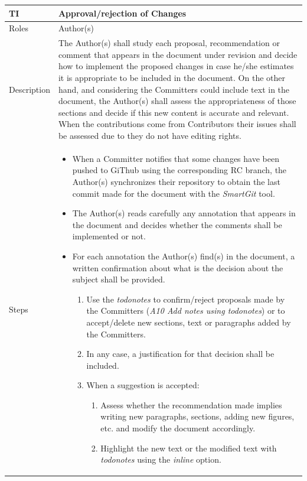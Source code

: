 \documentclass{template/openetcs_article}
\begin{document}
\begin{flushleft}
\tablefirsthead{}
\tablehead{}
\tabletail{}
\tablelasttail{}
\begin{supertabular}{|m{2cm}|m{13cm}|}
\hline
{}
TI & 
Approval/rejection of Changes
\\\hline
Roles &
Author(s)
\\\hline
Description &
The Author(s) shall study each proposal, recommendation or comment that appears in the document under revision and decide how to implement the proposed changes in case he/she estimates it is appropriate to be included in the document. On the other hand, and considering the Committers could include text in the document, the Author(s) shall assess the appropriateness of those sections and decide if this new content is accurate and relevant. When the contributions come from Contributors their issues shall be assessed due to they do not have editing rights.
\\\hline
Steps &
\begin{itemize}
\item When a Committer notifies that some changes have been pushed to GiThub using the corresponding RC branch, the Author(s) synchronizes their repository to obtain the last commit made for the document with the {\it SmartGit} tool.
\item The Author(s) reads carefully any annotation that appears in the document and decides whether the comments shall be implemented or not.
\item For each annotation the Author(s) find(s) in the document, a written confirmation about what is the decision about the subject shall be provided. 
\begin{enumerate}
\item Use the {\it todonotes} to confirm/reject proposals made by the Committers ({\it A10 Add notes using todonotes}) or to accept/delete new sections, text or paragraphs added by the Committers.
\item In any case, a justification for that decision shall be included.
\item When a suggestion is accepted:
\begin{enumerate}
\item Assess whether the recommendation made implies writing new paragraphs, sections, adding new figures, etc. and modify the document accordingly. 
\item Highlight the new text or the modified text with {\it todonotes} using the {\it inline} option.
\end{enumerate}

\end{enumerate}
\end{itemize}
\end{supertabular}
\end{flushleft}
\end{document}

